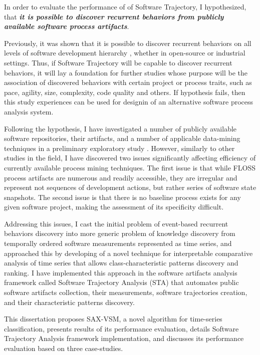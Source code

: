 In order to evaluate the performance of of Software Trajectory, I hypothesized, 
that \textbf{\textit{it is possible to discover recurrent behaviors from publicly available software 
process artifacts}}. 

Previously, it was shown that it is possible to discover recurrent behaviors on all levels of software 
development hierarchy \cite{citeulike:8347315}, whether in open-source \cite{citeulike:200721} 
or industrial \cite{citeulike:5090131} settings. Thus, if Software Trajectory will be capable to discover
recurrent behaviors, it will lay a foundation for further studies whose purpose will be the association 
of discovered behaviors with certain project or process traits, such as pace, agility, size, complexity, 
code quality and others. If hypothesis fails, then this study experiences can be used for designin of
an alternative software process analysis system.

Following the hypothesis, I have investigated a number of publicly available software repositories,
their artifacts, and a number of applicable data-mining techniques in a preliminary exploratory study 
\cite{csdl2-10-09}. However, similarly to other studies in the field, I have discovered two issues 
significantly affecting efficiency of currently available process mining techniques. 
The first issue is that while FLOSS process artifacts are numerous and readily accessible, 
they are irregular and represent not sequences of development actions, but rather series of software 
state snapshots. 
The second issue is that there is no baseline process exists for any given software project, making the 
assessment of its specificity difficult.

Addressing this issues, I cast the initial problem of event-based recurrent behaviors discovery into more 
generic problem of knowledge discovery from temporally ordered software measurements 
represented as time series, and approached this by developing of a novel technique for interpretable 
comparative analysis of time series that allows class-characteristic patterns discovery and ranking.
I have implemented this approach in the software artifacts analysis framework called 
Software Trajectory Analysis (STA) that automates public software artifacts collection, 
their measurements, software trajectories creation, and their characteristic patterns discovery. 

This dissertation proposes SAX-VSM, a novel algorithm for time-series classification, presents
results of its performance evaluation, details Software Trajectory Analysis framework implementation, 
and discusses its performance evaluation based on three case-studies.

